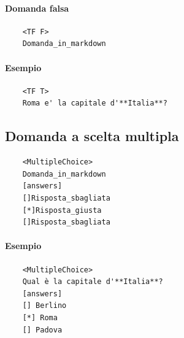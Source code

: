 \documentclass[12pt,a4paper]{article}
\begin{document}
	\paragraph{Domanda falsa}
	\begin{verbatim}
	<TF F>
	Domanda_in_markdown
	\end{verbatim}
	\paragraph{Esempio}
	\begin{verbatim}
	<TF T>
	Roma e' la capitale d'**Italia**?
	\end{verbatim}
	
	\subsection{Domanda a scelta multipla}
	\begin{verbatim}
	<MultipleChoice>
	Domanda_in_markdown
	[answers]
	[]Risposta_sbagliata
	[*]Risposta_giusta
	[]Risposta_sbagliata
	\end{verbatim}
	\paragraph{Esempio}
	\begin{verbatim}
	<MultipleChoice>
	Qual è la capitale d'**Italia**?
	[answers]
	[] Berlino
	[*] Roma
	[] Padova
	\end{verbatim}
	
	
\end{document}
